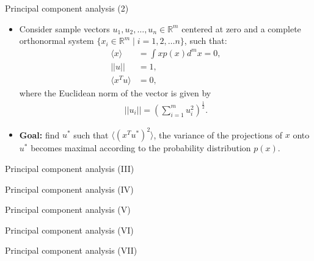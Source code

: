 \documentclass[aspectratio=169,t]{beamer}
\begin{document}
  {
    \begin{frame}{Principal component analysis (2)}
    \begin{itemize}
    \item Consider sample vectors $u_1, u_2, \ldots, u_n \in \mathbb{R}^m$ centered at zero and a complete orthonormal system $\{x_i \in \mathbb{R}^m \; \vert \; i = 1, 2, \ldots n\}$, such that:
    \begin{align}
      \langle x \rangle &= \int x p(x) d^m x = 0,\\
      \vert\vert u \vert\vert &= 1,\\
      \langle x^{T}u \rangle &= 0,
    \end{align}
    where the Euclidean norm of the vector is given by
    \begin{align}
      \vert\vert u_i \vert\vert = \left(\sum_{i=1}^{m} u_i^2\right)^\frac{1}{2}.
    \end{align}
      \item \textbf{Goal:} find $u^*$ such that $\langle (x^{T}u^*)^2 \rangle$, the variance of the projections of $x$ onto $u^*$ becomes maximal according to the probability distribution $p(x)$.
    \end{itemize}
    \end{frame}
  }

  {
    \begin{frame}{Principal component analysis (III)}

    \end{frame}
  }

  {
    \begin{frame}{Principal component analysis (IV)}

    \end{frame}
  }

  {
    \begin{frame}{Principal component analysis (V)}

    \end{frame}
  }

  {
    \begin{frame}{Principal component analysis (VI)}

    \end{frame}
  }

  {
    \begin{frame}{Principal component analysis (VII)}

    \end{frame}
  }
\end{document}
